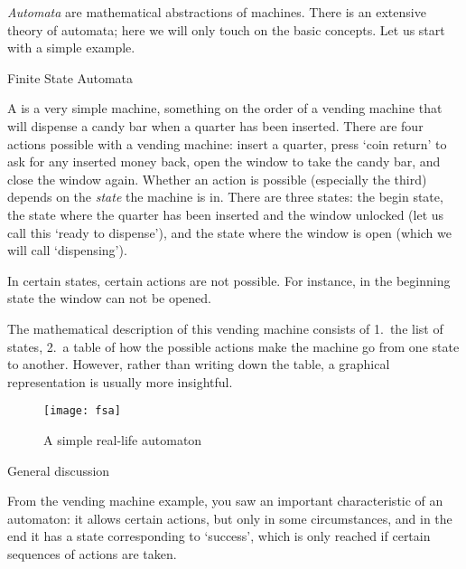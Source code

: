 

\emph{Automata} are mathematical abstractions of machines. 
There is an extensive theory of automata; here we will only touch on the basic concepts.
Let us start with a simple example.

 {Finite State Automata}

A  is a very simple machine, something on the order of
a vending machine that will dispense a candy bar when a
quarter has been inserted. There are four actions possible with a
vending machine: insert a quarter, press `coin return' to ask for any
inserted money back, open the window to take the candy bar, and close
the window again. Whether an action is possible (especially the third)
depends on the \emph{state} the machine is in. There are three states:
the begin state, the state where the quarter has been inserted and the
window unlocked (let us call this `ready to dispense'), and the state
where the window is open (which we will call `dispensing').

In certain states, certain
actions are not possible. For instance, in the beginning state the
window can not be opened.

The mathematical description of this vending machine consists of
1.~the list of states, 2.~a table of how the possible actions make the
machine go from one state to another. However, rather than writing
down the table, a graphical representation is usually more insightful.

\begin{figure}[ht]
  \texttt{[image: fsa]}
  \caption{A simple real-life automaton}
  \label{fig:automaton}
\end{figure}

 {General discussion}

From the vending machine example, you saw an important characteristic of an automaton: 
it allows certain actions, but only in some circumstances, and in the end it has a 
state corresponding to `success', which is only reached if certain sequences of actions
are taken.

